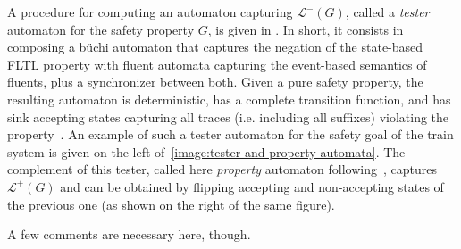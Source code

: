 A procedure for computing an automaton capturing $\mathcal{L}^{-}(G)$, called a \emph{tester} automaton for the safety property $G$, is given in \cite{Giannakopoulou:2003}. In short, it consists in composing a b\"uchi automaton that captures the negation of the state-based FLTL property with fluent automata capturing the event-based semantics of fluents, plus a synchronizer between both. Given a pure safety property, the resulting automaton is deterministic, has a complete transition function, and has sink accepting states capturing all traces (i.e. including all suffixes) violating the property~\cite{Giannakopoulou:2003}. An example of such a tester automaton for the safety goal of the train system is given on the left of~\ref{image:tester-and-property-automata}. The complement of this tester, called here \emph{property} automaton following~\cite{Letier:2005, Letier:2008}, captures $\mathcal{L}^{+}(G)$ and can be obtained by flipping accepting and non-accepting states of the previous one (as shown on the right of the same figure).

A few comments are necessary here, though.  

